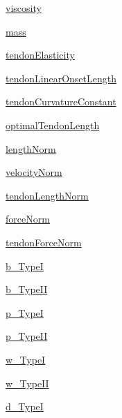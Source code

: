 \begin{DoxyCompactItemize}
\item 
\hyperlink{class_muscle_hill_1_1_muscle_hill_a7b471e4abf19f0d47902e1c48f8e729d}{viscosity}
\item 
\hyperlink{class_muscle_hill_1_1_muscle_hill_a5eab770f1108fc15db3effef9d0e58a6}{mass}
\item 
\hyperlink{class_muscle_hill_1_1_muscle_hill_a3dfc61515409b4e89bd52511d0ba0aa7}{tendon\+Elasticity}
\item 
\hyperlink{class_muscle_hill_1_1_muscle_hill_aa3fa7eedbc4569454c1c1afe95a13088}{tendon\+Linear\+Onset\+Length}
\item 
\hyperlink{class_muscle_hill_1_1_muscle_hill_a02595e2fd5a3aec4a4bb704d8d68a191}{tendon\+Curvature\+Constant}
\item 
\hyperlink{class_muscle_hill_1_1_muscle_hill_ae78df3a4cbb5899d12be637b75213ddc}{optimal\+Tendon\+Length}
\item 
\hyperlink{class_muscle_hill_1_1_muscle_hill_adabb54ae9958adea2ec9d22ac0c667ac}{length\+Norm}
\item 
\hyperlink{class_muscle_hill_1_1_muscle_hill_ab9fa9373e5e62179c06babb8f975c744}{velocity\+Norm}
\item 
\hyperlink{class_muscle_hill_1_1_muscle_hill_a7e43dbfcf2ffc57b2f8cbb2c01f7b3c3}{tendon\+Length\+Norm}
\item 
\hyperlink{class_muscle_hill_1_1_muscle_hill_ae7345d2c79095032fd7bcb3662f14cb0}{force\+Norm}
\item 
\hyperlink{class_muscle_hill_1_1_muscle_hill_a6d0b5deac8be35f8c5ac9fd55f7ff6f7}{tendon\+Force\+Norm}
\item 
\hyperlink{class_muscle_hill_1_1_muscle_hill_aa45e2e6c2b941c36567a60c9f866df04}{b\+\_\+\+TypeI}
\item 
\hyperlink{class_muscle_hill_1_1_muscle_hill_adcd92aefe2e17e4bcbfe73503f39087f}{b\+\_\+\+Type\+II}
\item 
\hyperlink{class_muscle_hill_1_1_muscle_hill_adcb089ccf7175739f980997d3d8fadb4}{p\+\_\+\+TypeI}
\item 
\hyperlink{class_muscle_hill_1_1_muscle_hill_a6f4b5ceaea19db29f7cd1b98e3750624}{p\+\_\+\+Type\+II}
\item 
\hyperlink{class_muscle_hill_1_1_muscle_hill_a9090fed9dd51dcd21e4440e78b7e19e6}{w\+\_\+\+TypeI}
\item 
\hyperlink{class_muscle_hill_1_1_muscle_hill_a9a0066f990fa6f90dd7f0b1eedef9d0c}{w\+\_\+\+Type\+II}
\item 
\hyperlink{class_muscle_hill_1_1_muscle_hill_a1ce553195461ab7f5d82f1cc6fdc444c}{d\+\_\+\+TypeI}

\end{DoxyCompactItemize}
